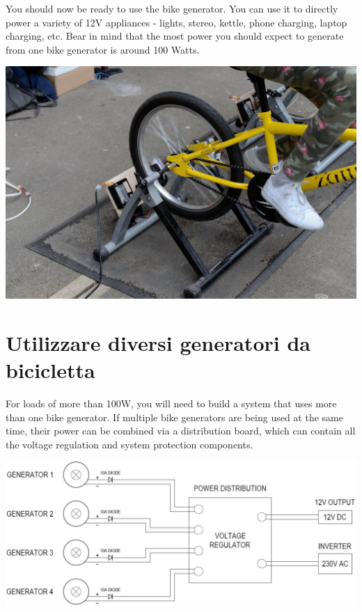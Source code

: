 \documentclass{article}
\theoremstyle{definition}
\theoremstyle{definition}
\theoremstyle{remark}
\begin{document}
  You should now be ready to use the bike generator. You can use it to directly power a variety of 12V appliances - lights, stereo, kettle, phone charging, laptop charging, etc. Bear in mind that the most power you should expect to generate from one bike generator is around 100 Watts.

  \begin{center}
    \includegraphics[width=0.45\paperwidth]{../Images/image_4_4_(generator_for_use).png}
  \end{center}


{\color{blue}\section{Utilizzare diversi generatori da bicicletta}} %
\label{sec:utilizzare_diversi_generatori_da_bicicletta}

  For loads of more than 100W, you will need to build a system that uses more than one bike generator. If multiple bike generators are being used at the same time, their power can be combined via a distribution board, which can contain all the voltage regulation and system protection components. 

  \begin{center}
    \includegraphics[width=0.75\paperwidth]{Images/image_5_1_(multiple_generator_diagram).png}
  \end{center}
\end{document}
